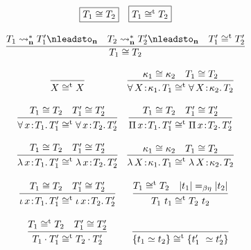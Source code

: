\documentclass{article}
\newcommand{\abs}[4]{{#1}\, #2\! : \! #3.\, #4}
\newcommand{\leadstocs}[0]{\ensuremath{\leadsto_{\mathbf{n}}^*}}
\newcommand{\nleadstoc}[0]{\ensuremath{\nleadsto_{\mathbf{n}}}}
\begin{document}
\begin{figure}
  \[
    \begin{array}{c}
      \fbox{\(T_1 \cong T_2\)}
      \quad \fbox{\(T_1 \cong^{\text{t}} T_2\)}
      \\ \\
      \infer{
       T_1 \cong T_2
      }{
       T_1 \leadstocs T_1' \nleadstoc
       \quad T_2 \leadstocs T_2' \nleadstoc
       \quad T_1' \cong^{\text{t}} T_2'
      }
      \\ \\
      \begin{array}{cc}
        \infer{X \cong^{\text{t}} X}{}
        &
        \infer{
         \abs{\forall}{X}{\kappa_1}{T_1} \cong^{\text{t}} \abs{\forall}{X}{\kappa_2}{T_2}
        }{
         \kappa_1 \cong \kappa_2
         \quad  T_1 \cong T_2
        }
        \\ \\
          \infer{
           \abs{\forall}{x}{T_1}{T_1'} \cong^{\text{t}} \abs{\forall}{x}{T_2}{T_2'}
          }{
           T_1 \cong T_2
           \quad  T_1' \cong T_2'
          }
        & 
        \infer{
         \abs{\Pi}{x}{T_1}{T_1'} \cong^{\text{t}} \abs{\Pi}{x}{T_2}{T_2'}
        }{
         T_1 \cong T_2
         \quad  T_1' \cong T_2'
        }
        \\ \\ 
          \infer{
           \abs{\lambda}{x}{T_1}{T_1'} \cong^{\text{t}} \abs{\lambda}{x}{T_2}{T_2'}
          }{
           T_1 \cong T_2
           \quad  T_1' \cong T_2'
          }
        & 
        \infer{
         \abs{\lambda}{X}{\kappa_1}{T_1} \cong^{\text{t}} \abs{\lambda}{X}{\kappa_2}{T_2}
        }{
         \kappa_1 \cong \kappa_2
         \quad  T_1 \cong T_2
        }
        \\ \\
          \infer{
          \abs{\iota}{x}{T_1}{T_1'} \cong^{\text{t}} \abs{\iota}{x}{T_2}{T_2'}
          }{
          T_1 \cong T_2
          \quad  T_1' \cong T_2'
          }
        & 
        \infer{
         T_1\ t_1 \cong^{\text{t}} T_2\ t_2
        }{
         T_1 \cong^{\text{t}} T_2 \quad |t_1| =_{\beta\eta} |t_2|
        }
        \\ \\
          \infer{
           T_1 \cdot T_1' \cong^{\text{t}} T_2 \cdot T_2'
          }{
           T_1 \cong^{\text{t}} T_2
           \quad T_1' \cong T_2'
          }
        &
        \infer{
         \{ t_1 \simeq t_2 \} \cong^{\text{t}} \{ t_1'\ \simeq t_2' \}
        }{
}
\end{array}
\end{array}\]
\end{figure}
\end{document}
